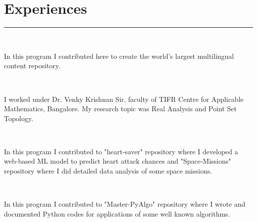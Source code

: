 \documentclass[]{debjitpal-resume}
\begin{document}
\begin{minipage}[t]{0.6\textwidth}
  \section{Experiences}
  \noindent\rule{12.5cm}{0.4pt}
   \\
  \noindent
  \hspace{4em}%
  \begin{minipage}{0.85\textwidth\vspace{2pt}}
    In this program I contributed here to create the world's largest multilingual content repository.\\
  \end{minipage}
  \sectionsep
   \\
  \noindent
  \hspace{4em}%
  \begin{minipage}{0.85\textwidth\vspace{2pt}}
    I worked under Dr. Venky Krishnan Sir, faculty of TIFR Centre for Applicable Mathematics, Bangalore. My research topic was Real Analysis and Point Set Topology.\\
  \end{minipage}
  \sectionsep
   \\
  \noindent
  \hspace{4em}%
  \begin{minipage}{0.85\textwidth\vspace{2pt}}
    In this program I contributed to "heart‐saver" repository where I developed a web-based ML model to predict heart attack chances and "Space‐Missions" repository where I did detailed data analysis of some space missions.\\
  \end{minipage}
  \sectionsep
   \\
  \noindent
  \hspace{4em}%
  \begin{minipage}{0.85\textwidth\vspace{2pt}}
    In this program I contributed to "Master-PyAlgo" repository where I wrote and documented Python codes for applications of some well known algorithms.\\
  \end{minipage}

\end{minipage}
\end{document}
